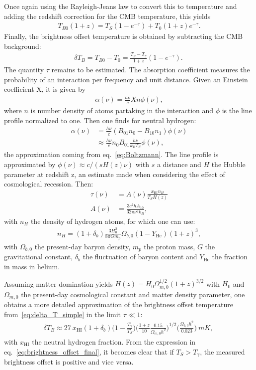 Once again using the Rayleigh-Jeans law to convert this to temperature and adding the redshift correction for the CMB temperature, this yields
\begin{align}
    T_{B0}(1+z) = T_S (1-e^{-\tau})+T_0 (1+z)e^{-\tau}. 
\end{align}
Finally, the brightness offset temperature is obtained by subtracting the CMB background:
\begin{align}
    \delta T_B = T_{B0} - T_0 = \frac{T_S - T_\gamma}{1+z}(1-e^{-\tau}).~\label{eq:delta_T_simple}
\end{align}
The quantity $\tau$ remains to be estimated. The absorption coefficient measures the probability of an interaction per frequency and unit distance. Given an Einstein coefficient X, it is given by 
\begin{align}
    \alpha(\nu) = \frac{h\nu}{c} X n \phi(\nu),
\end{align}
where $n$ is number density of atoms partaking in the interaction and $\phi$ is the line profile normalized to one. Then one finds for neutral hydrogen:
\begin{align}
    \alpha(\nu) 
    &= \frac{h\nu}{c}(B_{01}n_0 - B_{10}n_1)\phi(\nu)\\
    &\approx \frac{h\nu}{c}n_0 B_{01}\frac{h \nu}{k_B T_S}\phi(\nu),
\end{align}
the approximation coming from eq.~\ref{eq:Boltzmann}. The line profile is approximated by $\phi(\nu) \approx c/(s H(z) \nu)$ with $s$ a distance and $H$ the Hubble parameter at redshift z, an estimate made when considering the effect of cosmological recession. Then:
\begin{align}
    \tau(\nu) &= A(\nu) \frac{x_\text{HI}n_H }{T_S H(z)}\\
    A(\nu) &= \frac{3c^2 h A_{10}}{32 \pi \nu^2 k_B},
\end{align}
with $n_H$ the density of hydrogen atoms, for which one can use:
\begin{align}
    n_H = (1+\delta_b) \frac{3H_0^2}{8 \pi G m_p} \Omega_{b,0} (1-Y_\text{He})(1+z)^3,
\end{align}
with $\Omega_{b,0}$ the present-day baryon density, $m_p$ the proton mass, $G$ the gravitational constant, $\delta_b$ the fluctuation of baryon content and $Y_\text{He}$ the fraction in mass in helium.

Assuming matter domination yields $H(z) = H_0 \Omega^{1/2}_{m,0} (1 + z)^{3/2}$ with $H_0$ and $\Omega_{m,0}$ the present-day cosmological constant and matter density parameter, one obtains a more detailed approximation of the brightness offset temperature from~\ref{eq:delta_T_simple} in the limit $\tau \ll 1$:
\begin{align}
    \delta T_B \approx 27~x_{\text{HI}}(1+\delta_b)\biggl(1-\frac{T_\gamma}{T_S}\biggr)
    \biggl(\frac{1+z}{10}\frac{0.15}{\Omega_{m,0}h^2}\biggr)^{1/2}\biggl(\frac{\Omega_{b,0}h^2}{0.023}\biggr)~\si{mK},~\label{eq:brightness_offset_final}
\end{align} 
with $x_{\text{HI}}$ the neutral hydrogen fraction. From the expression in eq.~\ref{eq:brightness_offset_final}, it becomes clear that if $T_S > T_\gamma$, the measured brightness offset is positive and vice versa. 

